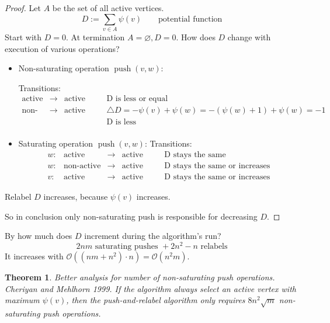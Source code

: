 \documentclass{article}
\newtheorem{theorem}{Theorem}
\DeclareMathOperator{\push}{push}
\begin{document}
\begin{proof}
  Let $A$ be the set of all active vertices.
  \[
    D := \sum_{v \in A} \psi(v) \qquad \text{potential function}
  \]
  Start with $D = 0$. At termination $A = \diameter, D = 0$.
  How does $D$ change with execution of various operations?

  \begin{itemize}
    \item Non-saturating operation $\push(v, w)$:

      Transitions:
      \[
        \begin{array}{rclcc}
          \text{active}     & \rightarrow & \text{active} & \quad & \text{D is less or equal} \\
          \text{non-active} & \rightarrow & \text{active} & \quad & \triangle D = -\psi(v) + \psi(w) = -(\psi(w) + 1) + \psi(w) = -1 \\
                            &             &               &       & \text{D is less} \\
        \end{array}
      \]
    
    \item Saturating operation $\push(v, w)$:
      Transitions:
      \[
        \begin{array}{rrclcc}
          w: & \text{active}     & \rightarrow & \text{active} & \quad & \text{D stays the same} \\
          w: & \text{non-active} & \rightarrow & \text{active} & \quad & \text{D stays the same or increases} \\
          v: & \text{active}     & \rightarrow & \text{active} & \quad & \text{D stays the same or increases}
        \end{array}
      \]
  \end{itemize}

  Relabel $D$ increases, because $\psi(v)$ increases.

  So in conclusion only non-saturating push is responsible for decreasing $D$.

\end{proof}

By how much does $D$ increment during the algorithm's run?
\[
  2nm \text{ saturating pushes } + 2n^2 - n \text{ relabels}
\]
It increases with $\mathcal{O}((nm + n^2) \cdot n) = \mathcal{O}(n^2m)$.

\begin{theorem}\label{lemma-4.14}
  \emph{Better analysis for number of non-saturating push operations. Cheriyan and Mehlhorn 1999.}
  If the algorithm always select an active vertex with maximum $\psi(v)$, then the push-and-relabel algorithm only requires $8n^2 \sqrt{m}$ non-saturating push operations.
\end{theorem}
\end{document}

